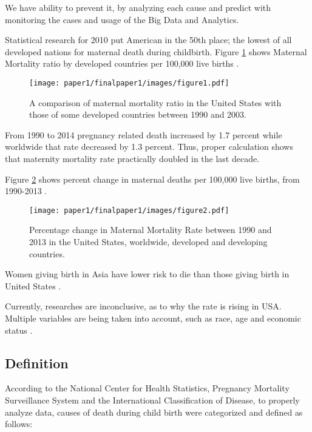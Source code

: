 \documentclass[sigconf]{acmart}
\begin{document}
We have ability to prevent it, by analyzing each cause and predict with monitoring the cases and usage of the Big Data and Analytics. 

Statistical research for 2010 put American in the 50th place; the lowest of all developed nations for maternal death during childbirth\cite{bingham2011maternal}. Figure \ref{fig:figure1} shows Maternal Mortality ratio by developed countries per 100,000 live births \cite{maron2015has}.

\begin{figure}
  \centering
  \texttt{[image: paper1/finalpaper1/images/figure1.pdf]}
  \caption{A comparison of maternal mortality ratio in the United States with those of some developed countries between 1990 and 2003.} \label{fig:figure1} 
\end{figure}

From 1990 to 2014 pregnancy related death increased by 1.7 percent while worldwide that rate decreased by 1.3 percent. Thus, proper calculation shows that maternity mortality rate practically doubled in the last decade.

Figure \ref{fig:figure2} shows percent change in maternal deaths per 100,000 live births, from 1990-2013 \cite{kassebaum2016global}.

\begin{figure}
  \centering
  \texttt{[image: paper1/finalpaper1/images/figure2.pdf]}
  \caption{Percentage change in Maternal Mortality Rate between 1990 and 2013 in the United States, worldwide, developed and developing countries.} \label{fig:figure2} 
\end{figure}

Women giving birth in Asia have lower risk to die than those giving birth in United States \cite{world2012trends}.

Currently, researches are inconclusive, as to why the rate is rising in USA. Multiple variables are being taken into account, such as race, age and economic status \cite{creanga2012race}.

\subsection{Definition}

According to the National Center for Health Statistics, Pregnancy Mortality Surveillance System and the International Classification of Disease, to properly analyze data, causes of death during child birth were categorized and defined \cite{callaghan2012overview} as follows:
\end{document}
